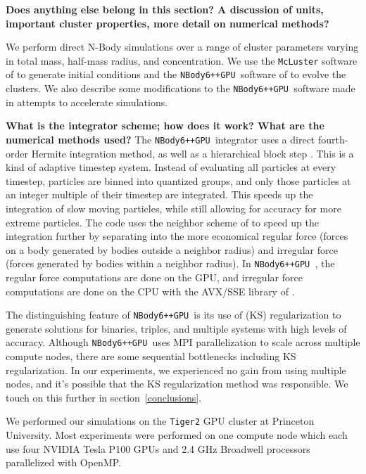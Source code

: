 \documentclass[preprint1]{aastex}
\newcommand\nbody{\texttt{NBody6++GPU }}
\numberwithin{equation}{section}
\begin{document}
\textbf{Does anything else belong in this section?  A discussion of units, important cluster properties, more detail on numerical methods?}

We perform direct N-Body simulations over a range of cluster parameters varying in total mass, half-mass radius, and concentration.  We use the \texttt{McLuster} software of \citet{2011Kupper} to generate initial conditions and the \nbody software of \citet{2015Wang} to evolve the clusters. We also describe some modifications to the \nbody software made in attempts to accelerate simulations.

\textbf{What is the integrator scheme; how does it work?  What are the numerical methods used?}
The \nbody integrator uses a direct fourth-order Hermite integration method, as well as a hierarchical block step \citep[][and refs within]{2015Wang}. This is a kind of adaptive timestep system. Instead of evaluating all particles at every timestep, particles are binned into quantized groups, and only those particles at an integer multiple of their timestep are integrated. This speeds up the integration of slow moving particles, while still allowing for accuracy for more extreme particles. The code uses the neighbor scheme of \citet{1973Ahmad} to speed up the integration further by separating into the more economical regular force (forces on a body generated by bodies outside a neighbor radius) and irregular force (forces generated by bodies within a neighbor radius). In \nbody, the regular force computations are done on the GPU, and irregular force computations are done on the CPU with the AVX/SSE library of \citet{2012Nitadori}.

The distinguishing feature of \nbody is its use of \citet{Kusta1965} (KS) regularization to generate solutions for binaries, triples, and multiple systems with high levels of accuracy. Although \nbody uses MPI parallelization to scale across multiple compute nodes, there are some sequential bottlenecks including KS regularization. In our experiments, we experienced no gain from using multiple nodes, and it's possible that the KS regularization method was responsible. We touch on this further in section~\ref{conclusions}.

We performed our simulations on the \texttt{Tiger2} GPU cluster at Princeton University. Most experiments were performed on one compute node which each use four NVIDIA Tesla P100 GPUs and 2.4 GHz Broadwell processors parallelized with OpenMP.
\end{document}
